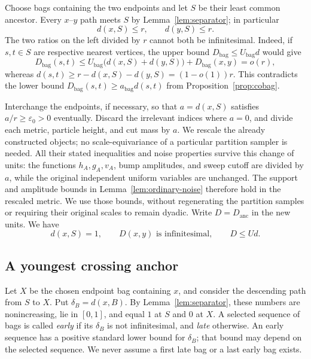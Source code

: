Choose bags containing the two endpoints and let $S$ be their least
common ancestor.  Every $x$--$y$ path meets $S$ by
Lemma~\ref{lem:separator}; in particular
\begin{equation}\label{eq:lca-distance-bound}
 d(x,S)\leq r,\qquad d(y,S)\leq r.
\end{equation}
The two ratios on the left divided by $r$ cannot both be infinitesimal.
Indeed, if $s,t\in S$ are respective nearest vertices, the upper bound
$D_{\mathrm{bag}}\leq U_{\mathrm{bag}}d$ would give
\[
 D_{\mathrm{bag}}(s,t)
 \leq U_{\mathrm{bag}}\bigl(d(x,S)+d(y,S)\bigr)
       +D_{\mathrm{bag}}(x,y)=o(r),
\]
whereas
$d(s,t)\geq r-d(x,S)-d(y,S)=(1-o(1))r$.
This contradicts the lower bound
$D_{\mathrm{bag}}(s,t)\geq a_{\mathrm{bag}}d(s,t)$ from
Proposition~\ref{prop:cobag}.

Interchange the endpoints, if necessary, so that $a=d(x,S)$ satisfies
$a/r\geq\varepsilon_0>0$ eventually.  Discard the irrelevant indices
where $a=0$, and divide each metric, particle height, and cut mass by
$a$.  We rescale the already constructed objects; no scale-equivariance
of a particular partition sampler is needed.  All their stated
inequalities and noise properties survive this change of units: the
functions $h_A,g_A,v_A$, bump amplitudes, and sweep cutoff are divided by
$a$, while the original independent uniform variables are unchanged.
The support and amplitude bounds in
Lemma~\ref{lem:ordinary-noise} therefore hold in the rescaled metric.
We use those bounds, without regenerating the partition samples or
requiring their original scales to remain dyadic.  Write
$D=D_{\mathrm{anc}}$ in the new units.  We have
\begin{equation}\label{eq:normalized-failure}
 d(x,S)=1,\qquad D(x,y)\text{ is infinitesimal},\qquad D\leq Ud.
\end{equation}

\subsection{A youngest crossing anchor}

Let $X$ be the chosen endpoint bag containing $x$, and consider the
descending path from $S$ to $X$.  Put $\delta_B=d(x,B)$.  By
Lemma~\ref{lem:separator}, these numbers are nonincreasing, lie in
$[0,1]$, and equal $1$ at $S$ and $0$ at $X$.  A selected sequence of
bags is called \emph{early} if its $\delta_B$ is not infinitesimal,
and \emph{late} otherwise.  An early sequence has a positive standard
lower bound for $\delta_B$; that bound may depend on the selected
sequence.  We never assume a first late bag or a last early bag exists.

